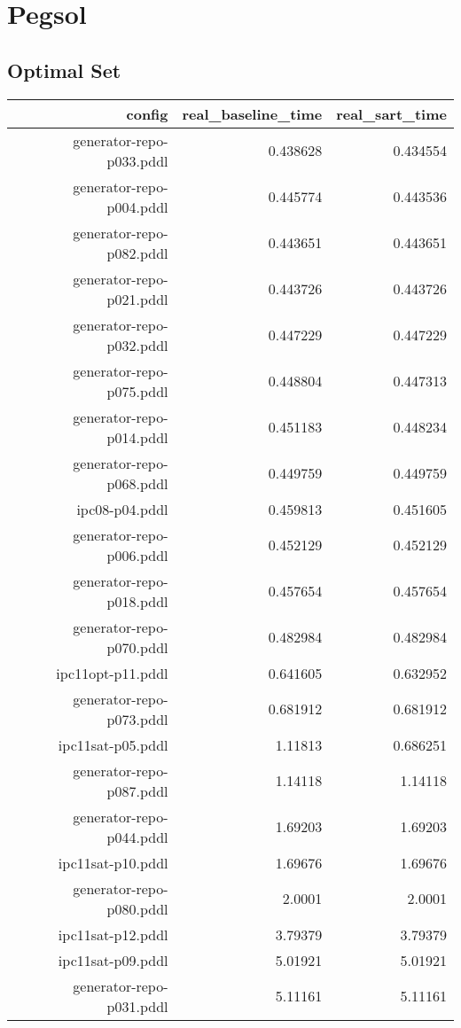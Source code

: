 \documentclass{article}
\begin{document}
                \newpage \section{Pegsol}
                    \subsection*{Optimal Set}
                    
                            \begin{center}
                            \scriptsize
                            \begin{tabular}{r|r|r}
                            config & real\_baseline\_time & real\_sart\_time\\\midrule
                             generator-repo-p033.pddl&0.438628&0.434554\\
 generator-repo-p004.pddl&0.445774&0.443536\\
 generator-repo-p082.pddl&0.443651&0.443651\\
 generator-repo-p021.pddl&0.443726&0.443726\\
 generator-repo-p032.pddl&0.447229&0.447229\\
 generator-repo-p075.pddl&0.448804&0.447313\\
 generator-repo-p014.pddl&0.451183&0.448234\\
 generator-repo-p068.pddl&0.449759&0.449759\\
 ipc08-p04.pddl&0.459813&0.451605\\
 generator-repo-p006.pddl&0.452129&0.452129\\
 generator-repo-p018.pddl&0.457654&0.457654\\
 generator-repo-p070.pddl&0.482984&0.482984\\
 ipc11opt-p11.pddl&0.641605&0.632952\\
 generator-repo-p073.pddl&0.681912&0.681912\\
 ipc11sat-p05.pddl&1.11813&0.686251\\
 generator-repo-p087.pddl&1.14118&1.14118\\
 generator-repo-p044.pddl&1.69203&1.69203\\
 ipc11sat-p10.pddl&1.69676&1.69676\\
 generator-repo-p080.pddl&2.0001&2.0001\\
 ipc11sat-p12.pddl&3.79379&3.79379\\
 ipc11sat-p09.pddl&5.01921&5.01921\\
 generator-repo-p031.pddl&5.11161&5.11161\\

\end{tabular}
\end{center}
\end{document}
